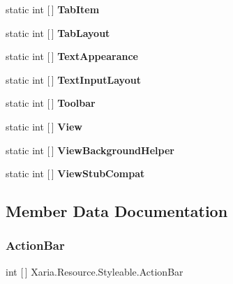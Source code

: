 \begin{DoxyCompactItemize}
static int \mbox{[}$\,$\mbox{]} {\bfseries Tab\+Item}
\item 
static int \mbox{[}$\,$\mbox{]} {\bfseries Tab\+Layout}
\item 
static int \mbox{[}$\,$\mbox{]} {\bfseries Text\+Appearance}
\item 
static int \mbox{[}$\,$\mbox{]} {\bfseries Text\+Input\+Layout}
\item 
static int \mbox{[}$\,$\mbox{]} {\bfseries Toolbar}
\item 
static int \mbox{[}$\,$\mbox{]} {\bfseries View}
\item 
static int \mbox{[}$\,$\mbox{]} {\bfseries View\+Background\+Helper}
\item 
static int \mbox{[}$\,$\mbox{]} {\bfseries View\+Stub\+Compat}
\end{DoxyCompactItemize}


\subsection{Member Data Documentation}
\mbox{\label{classXaria_1_1Resource_1_1Styleable_af2650c52d3cb05b60ea64c4d99e041de}} 
\subsubsection{\texorpdfstring{Action\+Bar}{ActionBar}}
{\footnotesize\ttfamily int \mbox{[}$\,$\mbox{]} Xaria.\+Resource.\+Styleable.\+Action\+Bar\hspace{0.3cm}{\ttfamily [static]}}

